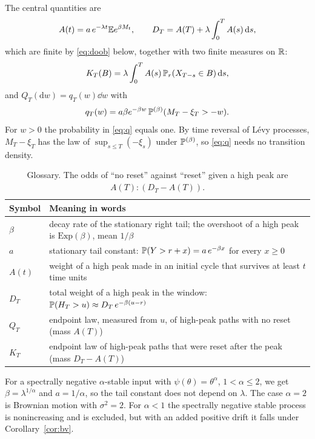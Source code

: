 \documentclass[11pt,a4paper]{article}
\begin{document}
The central quantities are
\begin{equation}\label{eq:AD}
 A(t)=a\,e^{-\lambda t}\mathbb E e^{\beta M_t},\qquad D_T=A(T)+\lambda\int_0^TA(s)\,\mathrm d s,
\end{equation}
which are finite by \eqref{eq:doob} below, together with two finite measures on $\mathbb R$:
\begin{equation}\label{eq:K}
 K_T(B)=\lambda\int_0^TA(s)\,\mathbb P_r(X_{T-s}\in B)\,\mathrm d s,
\end{equation}
and $Q_T(\mathrm dw)=q_T(w)\dd w$ with
\begin{equation}\label{eq:q}
 q_T(w)=a\beta e^{-\beta w}\,\mathbb P^{(\beta)}(M_T-\xi_T>-w).
\end{equation}
For $w>0$ the probability in \eqref{eq:q} equals one. By time reversal of L\'evy processes, $M_T-\xi_T$ has the law of $\sup_{s\le T}(-\xi_s)$ under $\mathbb P^{(\beta)}$, so \eqref{eq:q} needs no transition density.

\begin{table}[h]
\centering\small
\begin{tabular}{@{}ll@{}}
\toprule
Symbol & Meaning in words\\
\midrule
$\beta$ & decay rate of the stationary right tail; the overshoot of a high peak is $\mathrm{Exp}(\beta)$, mean $1/\beta$\\
$a$ & stationary tail constant: $\mathbb P(Y>r+x)=a\,e^{-\beta x}$ for every $x\ge0$\\
$A(t)$ & weight of a high peak made in an initial cycle that survives at least $t$ time units\\
$D_T$ & total weight of a high peak in the window: $\mathbb P(H_T>u)\approx D_T\,e^{-\beta(u-r)}$\\
$Q_T$ & endpoint law, measured from $u$, of high-peak paths with no reset (mass $A(T)$)\\
$K_T$ & endpoint law of high-peak paths that were reset after the peak (mass $D_T-A(T)$)\\
\bottomrule
\end{tabular}
\caption{Glossary. The odds of ``no reset'' against ``reset'' given a high peak are $A(T):(D_T-A(T))$.}
\label{tab:glossary}
\end{table}

\begin{remark}\label{rem:stable}
For a spectrally negative $\alpha$-stable input with $\psi(\theta)=\theta^\alpha$, $1<\alpha\le2$, we get $\beta=\lambda^{1/\alpha}$ and $a=1/\alpha$, so the tail constant does not depend on $\lambda$. The case $\alpha=2$ is Brownian motion with $\sigma^2=2$. For $\alpha<1$ the spectrally negative stable process is nonincreasing and is excluded, but with an added positive drift it falls under Corollary~\ref{cor:bv}.
\end{remark}
\end{document}
